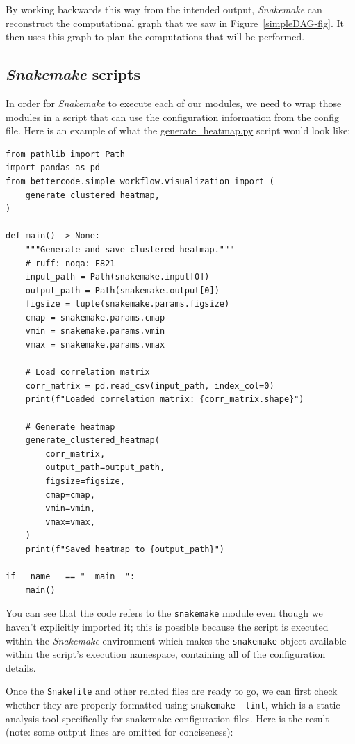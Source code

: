 By working backwards this way from the intended output, \textit{Snakemake} can reconstruct the computational graph that we saw in Figure~\ref{simpleDAG-fig}.  It then uses this graph to plan the computations that will be performed.

\subsection{\textit{Snakemake} scripts}

In order for \textit{Snakemake} to execute each of our modules, we need to wrap those modules in a script that can use the configuration information from the config file.  Here is an example of what the \href{https://github.com/BetterCodeBetterScience/example-simpleworkflow/blob/main/snakemake\_workflow/scripts/generate\_heatmap.py}{generate\_heatmap.py} script would look like:

\begin{lstlisting}[style=Python]
from pathlib import Path
import pandas as pd
from bettercode.simple_workflow.visualization import (
    generate_clustered_heatmap,
)

def main() -> None:
    """Generate and save clustered heatmap."""
    # ruff: noqa: F821
    input_path = Path(snakemake.input[0])
    output_path = Path(snakemake.output[0])
    figsize = tuple(snakemake.params.figsize)
    cmap = snakemake.params.cmap
    vmin = snakemake.params.vmin
    vmax = snakemake.params.vmax

    # Load correlation matrix
    corr_matrix = pd.read_csv(input_path, index_col=0)
    print(f"Loaded correlation matrix: {corr_matrix.shape}")

    # Generate heatmap
    generate_clustered_heatmap(
        corr_matrix,
        output_path=output_path,
        figsize=figsize,
        cmap=cmap,
        vmin=vmin,
        vmax=vmax,
    )
    print(f"Saved heatmap to {output_path}")

if __name__ == "__main__":
    main()
\end{lstlisting}

You can see that the code refers to the \texttt{snakemake} module even though we haven't explicitly imported it; this is possible because the script is executed within the \textit{Snakemake} environment which makes the \texttt{snakemake} object available within the script's execution namespace, containing all of the configuration details.  

Once the \texttt{Snakefile}  and other related files are ready to go, we can first check whether they are properly formatted using \texttt{snakemake --lint}, which is a static analysis tool specifically for snakemake configuration files.  Here is the result (note: some output lines are omitted for conciseness):

